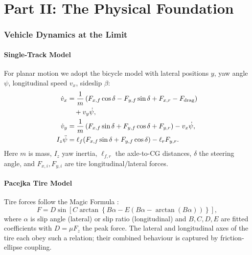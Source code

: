 \documentclass[11pt,twocolumn]{article}
\theoremstyle{definition}
\theoremstyle{remark}
\begin{document}
\bigskip

\part*{Part II: The Physical Foundation}

\section{Vehicle Dynamics at the Limit}
\label{sec:vehicle-dynamics}

\subsection{Single-Track Model}

For planar motion we adopt the bicycle model \cite{rajamani2011vehicle,jazar2017vehicle,gillespie1992fundamentals} with lateral positions $y$, yaw angle $\psi$, longitudinal speed $v_x$, sideslip $\beta$:
\begin{align}
\dot{v}_x &= \frac{1}{m}\left(F_{x,f}\cos\delta - F_{y,f}\sin\delta + F_{x,r} - F_{\mathrm{drag}}\right) \notag\\
&\quad + v_y \dot\psi,\\
\dot{v}_y &= \frac{1}{m}\left(F_{x,f}\sin\delta + F_{y,f}\cos\delta + F_{y,r}\right) - v_x \dot\psi,\\
I_z \ddot{\psi} &= \ell_f (F_{x,f}\sin\delta + F_{y,f}\cos\delta) - \ell_r F_{y,r}.
\end{align}
Here $m$ is mass, $I_z$ yaw inertia, $\ell_{f,r}$ the axle-to-CG distances, $\delta$ the steering angle, and $F_{x,i}, F_{y,i}$ are tire longitudinal/lateral forces.

\subsection{Pacejka Tire Model}

Tire forces follow the Magic Formula \cite{pacejka2012tyre}:
\begin{equation}
F = D \sin\left[C \arctan\left\{B\alpha - E\left(B\alpha - \arctan(B\alpha)\right)\right\}\right],
\end{equation}
where $\alpha$ is slip angle (lateral) or slip ratio (longitudinal) and $B,C,D,E$ are fitted coefficients with $D = \mu F_z$ the peak force. The lateral and longitudinal axes of the tire each obey such a relation; their combined behaviour is captured by friction-ellipse coupling.
\end{document}
